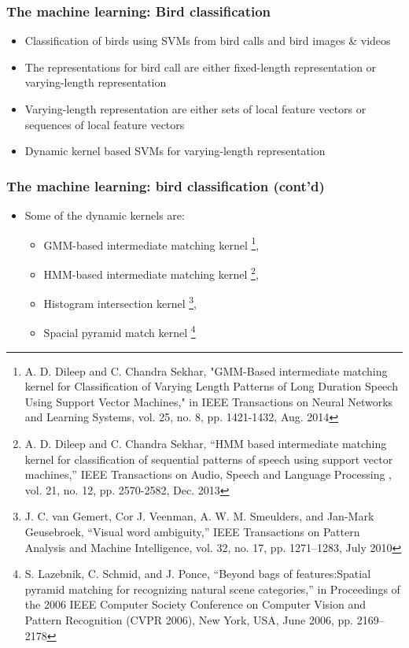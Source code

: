 \documentclass[mathserif]{beamer}
\begin{document}
\begin{frame}
\frametitle{The machine learning: Bird classification}
\begin{itemize}
\item<2-> Classification of birds using SVMs from bird calls and bird images \& videos
\item<3-> The representations for bird call are either fixed-length
representation or varying-length representation
\item<4-> Varying-length representation are either sets of local feature vectors or sequences of local feature vectors
\item<5-> Dynamic kernel based SVMs for varying-length representation
\end{itemize}
\end{frame}

\begin{frame}
\frametitle{The machine learning: bird classification (cont'd)}
\begin{itemize}
\item<2-> Some of the dynamic kernels are:
\begin{itemize}
	\item GMM-based intermediate matching kernel \footnote{
	A. D. Dileep and C. Chandra Sekhar, "GMM-Based intermediate matching kernel for Classification of Varying Length Patterns of Long Duration Speech Using Support Vector Machines," in IEEE Transactions on Neural Networks and Learning Systems, vol. 25, no. 8, pp. 1421-1432, Aug. 2014},
	\item HMM-based intermediate matching kernel \footnote{A. D. Dileep and C. Chandra Sekhar, “HMM based intermediate matching kernel for classification of sequential patterns of speech using support vector machines,” IEEE Transactions on Audio, Speech and Language Processing , vol. 21, no. 12, pp. 2570-2582, Dec. 2013}, 
	\item Histogram intersection kernel \footnote{J. C. van Gemert, Cor J. Veenman, A. W. M. Smeulders, and Jan-Mark Geusebroek, “Visual word ambiguity,” IEEE Transactions on Pattern Analysis and Machine Intelligence, vol. 32, no. 17, pp. 1271–1283, July 2010}, 
	\item Spacial pyramid match kernel \footnote{S. Lazebnik, C. Schmid, and J. Ponce, “Beyond bags of features:Spatial pyramid matching for recognizing natural scene categories,” in Proceedings of the 2006 IEEE Computer Society Conference on Computer Vision and Pattern Recognition (CVPR 2006), New York, USA, June 2006, pp. 2169–2178}
\end{itemize}
\end{itemize}
\end{frame}
\end{document}
